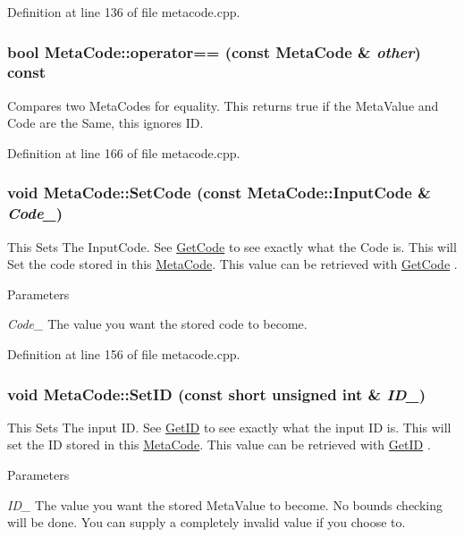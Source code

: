Definition at line 136 of file metacode.cpp.\hypertarget{classMetaCode_a296b774682a9326494e0c2d1b357ec2a}{
\subsubsection[{operator==}]{\setlength{\rightskip}{0pt plus 5cm}bool MetaCode::operator== (const {\bf MetaCode} \& {\em other}) const}}
\label{d7/d72/classMetaCode_a296b774682a9326494e0c2d1b357ec2a}


Compares two MetaCodes for equality. This returns true if the MetaValue and Code are the Same, this ignores ID. 

Definition at line 166 of file metacode.cpp.\hypertarget{classMetaCode_a9be5fcad22449c12b649801ab97bbf20}{
\subsubsection[{SetCode}]{\setlength{\rightskip}{0pt plus 5cm}void MetaCode::SetCode (const {\bf MetaCode::InputCode} \& {\em Code\_\-})}}
\label{d7/d72/classMetaCode_a9be5fcad22449c12b649801ab97bbf20}


This Sets The InputCode. See \hyperlink{classMetaCode_a94532fc103d95f3de53eeccbadd6f17b}{GetCode} to see exactly what the Code is. This will Set the code stored in this \hyperlink{classMetaCode}{MetaCode}. This value can be retrieved with \hyperlink{classMetaCode_a94532fc103d95f3de53eeccbadd6f17b}{GetCode} . 
\begin{DoxyParams}{Parameters}
\item[{\em Code\_\-}]The value you want the stored code to become. \end{DoxyParams}


Definition at line 156 of file metacode.cpp.\hypertarget{classMetaCode_a0eb10030320a1fcfdda3b867b90e629f}{
\subsubsection[{SetID}]{\setlength{\rightskip}{0pt plus 5cm}void MetaCode::SetID (const short unsigned int \& {\em ID\_\-})}}
\label{d7/d72/classMetaCode_a0eb10030320a1fcfdda3b867b90e629f}


This Sets The input ID. See \hyperlink{classMetaCode_a680b5e1c2ce8d8d08d00f10187728547}{GetID} to see exactly what the input ID is. This will set the ID stored in this \hyperlink{classMetaCode}{MetaCode}. This value can be retrieved with \hyperlink{classMetaCode_a680b5e1c2ce8d8d08d00f10187728547}{GetID} . 
\begin{DoxyParams}{Parameters}
\item[{\em ID\_\-}]The value you want the stored MetaValue to become. No bounds checking will be done. You can supply a completely invalid value if you choose to. \end{DoxyParams}


